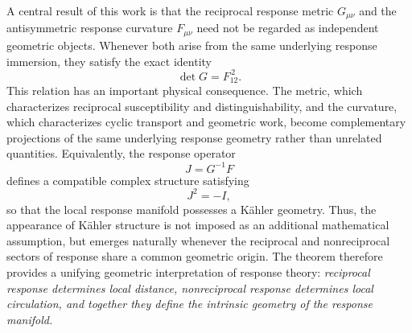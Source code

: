 \begin{tcolorbox}[
colback=blue!3,
colframe=blue!60!black,
title=\textbf{Response Immersion Theorem: Why It Matters},
fonttitle=\bfseries]
A central result of this work is that the reciprocal response metric
$G_{\mu\nu}$ and the antisymmetric response curvature
$F_{\mu\nu}$ need not be regarded as independent geometric objects.
Whenever both arise from the same underlying response immersion,
they satisfy the exact identity
\begin{equation}
\boxed{
\det G = F_{12}^{\,2}.
}
\end{equation}
This relation has an important physical consequence.  The metric,
which characterizes reciprocal susceptibility and
distinguishability, and the curvature, which characterizes cyclic
transport and geometric work, become complementary projections of
the same underlying response geometry rather than unrelated
quantities.
Equivalently, the response operator
\[
J = G^{-1}F
\]
defines a compatible complex structure satisfying
\[
J^2=-I,
\]
so that the local response manifold possesses a K\"ahler geometry.
Thus, the appearance of K\"ahler structure is not imposed as an
additional mathematical assumption, but emerges naturally whenever
the reciprocal and nonreciprocal sectors of response share a common
geometric origin.
The theorem therefore provides a unifying geometric interpretation
of response theory: \emph{reciprocal response determines local
distance, nonreciprocal response determines local circulation, and
together they define the intrinsic geometry of the response
manifold.}
\end{tcolorbox}